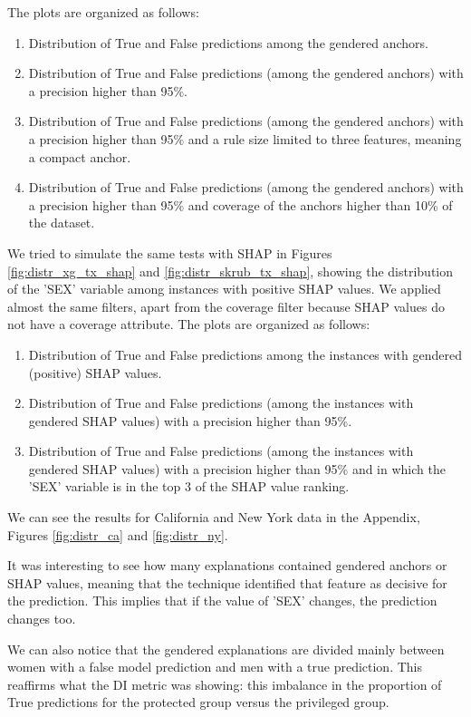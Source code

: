 The plots are organized as follows:
\begin{enumerate}
	\item Distribution of True and False predictions among the gendered anchors.
	\item Distribution of True and False predictions (among the gendered anchors) with a precision higher than 95\%.
	\item Distribution of True and False predictions (among the gendered anchors) with a precision higher than 95\% and a rule size limited to three features, meaning a compact anchor.
	\item Distribution of True and False predictions (among the gendered anchors) with a precision higher than 95\% and coverage of the anchors higher than 10\% of the dataset.
\end{enumerate}

We tried to simulate the same tests with SHAP in Figures \ref{fig:distr_xg_tx_shap} and \ref{fig:distr_skrub_tx_shap}, showing the distribution of the 'SEX' variable among instances with positive SHAP values. We applied almost the same filters, apart from the coverage filter because SHAP values do not have a coverage attribute.
The plots are organized as follows:
\begin{enumerate}
	\item Distribution of True and False predictions among the instances with gendered (positive) SHAP values.
	\item Distribution of True and False predictions (among the instances with gendered SHAP values) with a precision higher than 95\%.
	\item Distribution of True and False predictions (among the instances with gendered SHAP values) with a precision higher than 95\% and in which the 'SEX' variable is in the top 3 of the SHAP value ranking.
\end{enumerate}

We can see the results for California and New York data in the Appendix, Figures \ref{fig:distr_ca} and \ref{fig:distr_ny}.

It was interesting to see how many explanations contained gendered anchors or SHAP values, meaning that the technique identified that feature as decisive for the prediction. This implies that if the value of 'SEX' changes, the prediction changes too.

We can also notice that the gendered explanations are divided mainly between women with a false model prediction and men with a true prediction. This reaffirms what the DI metric was showing: this imbalance in the proportion of True predictions for the protected group versus the privileged group.

